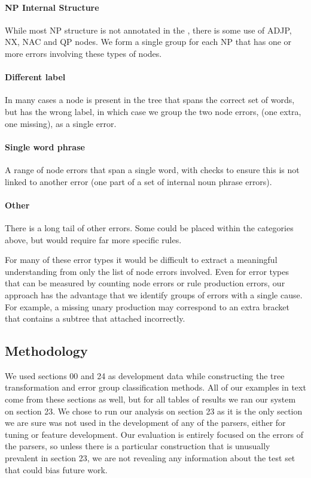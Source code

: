 \paragraph{NP Internal Structure}
While most NP structure is not annotated in the \ptb, there is some use of ADJP, NX, NAC and QP nodes.
We form a single group for each NP that has one or more errors involving these types of nodes.

\paragraph{Different label}
In many cases a node is present in the tree that spans the correct set of words, but has the wrong label, in which case we group the two node errors, (one extra, one missing), as a single error.

\paragraph{Single word phrase}
A range of node errors that span a single word, with checks to ensure this is not linked to another error (\myeg one part of a set of internal noun phrase errors).

\paragraph{Other}
There is a long tail of other errors.
Some could be placed within the categories above, but would require far more specific rules.

For many of these error types it would be difficult to extract a meaningful understanding from only the list of node errors involved.
Even for error types that can be measured by counting node errors or rule production errors, our approach has the advantage that we identify groups of errors with a single cause.
For example, a missing unary production may correspond to an extra bracket that contains a subtree that attached incorrectly.

\subsection{Methodology}

We used sections 00 and 24 as development data while constructing the tree transformation and error group classification methods.
All of our examples in text come from these sections as well, but for all tables of results we ran our system on section 23.
We chose to run our analysis on section 23 as it is the only section we are sure was not used in the development of any of the parsers, either for tuning or feature development.
Our evaluation is entirely focused on the errors of the parsers, so unless there is a particular construction that is unusually prevalent in section 23, we are not revealing any information about the test set that could bias future work.

